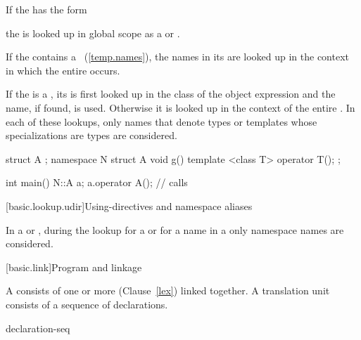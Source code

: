 \pnum
If the  has the form

\begin{indented}
\end{indented}

the  is looked up in global scope
as a  or .

\pnum
If the  contains a
~(\ref{temp.names}), the names in its
 are looked up in the context in which the
entire  occurs.

\pnum
If the  is a ,
its 
is first looked up in the class of the object expression and the name, if
found, is used. Otherwise it is looked up in the context
of the entire .
In each of these lookups, only names that denote types or templates whose
specializations are types are considered.
\enterexample
\begin{codeblock}
struct A { };
namespace N {
  struct A {
    void g() { }
    template <class T> operator T();
  };
}

int main() {
  N::A a;
  a.operator A();               // calls 
}
\end{codeblock}
\exitexample

[basic.lookup.udir]{Using-directives and namespace aliases}

\pnum
{}%
%
In a  or ,
during the lookup for a  or for a name in a
only namespace names are considered.%
%

[basic.link]{Program and linkage}%

\pnum
{}%
A  consists of one or more  (Clause~\ref{lex}) linked together. A translation unit consists
of a sequence of declarations.

\begin{bnf}
\br
    declaration-seq\opt
\end{bnf}

